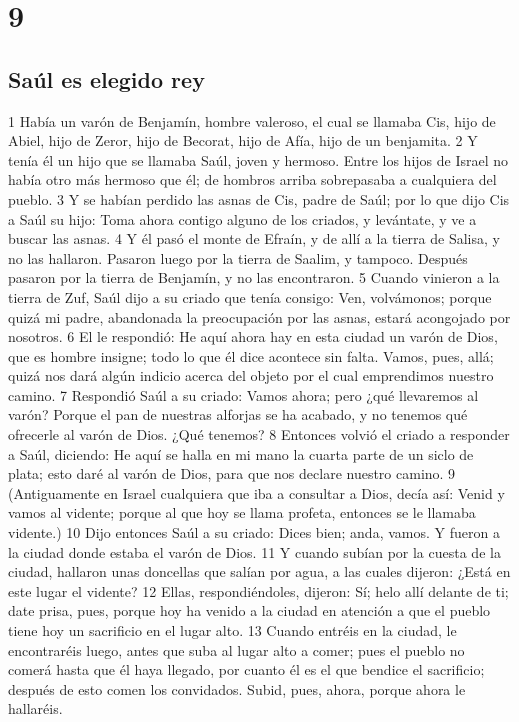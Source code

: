 \chapter{9}

\section*{Saúl es elegido rey}

1 Había un varón de Benjamín, hombre valeroso, el cual se llamaba Cis, hijo de Abiel, hijo de Zeror, hijo de Becorat, hijo de Afía, hijo de un benjamita.
2 Y tenía él un hijo que se llamaba Saúl, joven y hermoso. Entre los hijos de Israel no había otro más hermoso que él; de hombros arriba sobrepasaba a cualquiera del pueblo.
3 Y se habían perdido las asnas de Cis, padre de Saúl; por lo que dijo Cis a Saúl su hijo: Toma ahora contigo alguno de los criados, y levántate, y ve a buscar las asnas.
4 Y él pasó el monte de Efraín, y de allí a la tierra de Salisa, y no las hallaron. Pasaron luego por la tierra de Saalim, y tampoco. Después pasaron por la tierra de Benjamín, y no las encontraron.
5 Cuando vinieron a la tierra de Zuf, Saúl dijo a su criado que tenía consigo: Ven, volvámonos; porque quizá mi padre, abandonada la preocupación por las asnas, estará acongojado por nosotros.
6 El le respondió: He aquí ahora hay en esta ciudad un varón de Dios, que es hombre insigne; todo lo que él dice acontece sin falta. Vamos, pues, allá; quizá nos dará algún indicio acerca del objeto por el cual emprendimos nuestro camino.
7 Respondió Saúl a su criado: Vamos ahora; pero ¿qué llevaremos al varón? Porque el pan de nuestras alforjas se ha acabado, y no tenemos qué ofrecerle al varón de Dios. ¿Qué tenemos?
8 Entonces volvió el criado a responder a Saúl, diciendo: He aquí se halla en mi mano la cuarta parte de un siclo de plata;  esto daré al varón de Dios, para que nos declare nuestro camino.
9 (Antiguamente en Israel cualquiera que iba a consultar a Dios, decía así: Venid y vamos al vidente; porque al que hoy se llama profeta, entonces se le llamaba vidente.)
10 Dijo entonces Saúl a su criado: Dices bien; anda, vamos. Y fueron a la ciudad donde estaba el varón de Dios.
11 Y cuando subían por la cuesta de la ciudad, hallaron unas doncellas que salían por agua, a las cuales dijeron: ¿Está en este lugar el vidente?
12 Ellas, respondiéndoles, dijeron: Sí; helo allí delante de ti; date prisa, pues, porque hoy ha venido a la ciudad en atención a que el pueblo tiene hoy un sacrificio en el lugar alto.
13 Cuando entréis en la ciudad, le encontraréis luego, antes que suba al lugar alto a comer; pues el pueblo no comerá hasta que él haya llegado, por cuanto él es el que bendice el sacrificio; después de esto comen los convidados. Subid, pues, ahora, porque ahora le hallaréis.
